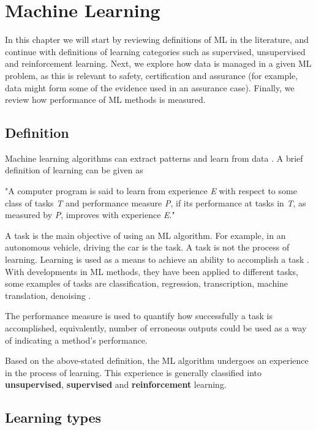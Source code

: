 \chapter{Machine Learning}
\label{chap:ML}

In this chapter we will start by reviewing definitions of ML in the literature, and continue with definitions of learning categories such as supervised, unsupervised and reinforcement learning. Next, we explore how data is managed in a given ML problem, as this is relevant to safety, certification and assurance (for example, data might form some of the evidence used in an assurance case). Finally, we review how performance of ML methods is measured.

\section{Definition}
Machine learning algorithms can extract patterns and learn from data \cite{IanGoodfellow2016}. A brief definition of learning can be given as \cite{mitchell1997machine}
\begin{displayquote}[][]
    "A computer program is said to learn from experience \textit{E} with respect to some class of tasks \textit{T} and performance measure \textit{P}, if its performance at tasks in \textit{T}, as measured by \textit{P}, improves with experience \textit{E}."
\end{displayquote}

A task is the main objective of using an ML algorithm. For example, in an autonomous vehicle, driving the car is the task. A task is not the process of learning. Learning is used as a means to achieve an ability to accomplish a task \cite{IanGoodfellow2016}. With developments in ML methods, they have been applied to different tasks, some examples of tasks are classification, regression, transcription, machine translation, denoising \cite{IanGoodfellow2016}.

The performance measure is used to quantify how successfully a task is accomplished, equivalently, number of erroneous outputs could be used as a way of indicating a method's performance. 

Based on the above-stated definition, the ML algorithm undergoes an experience in the process of learning. This experience is generally classified into \textbf{unsupervised}, \textbf{supervised} and \textbf{reinforcement} learning.

\section{Learning types}

